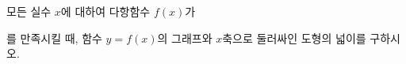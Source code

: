 모든 실수 $x$에 대하여 다항함수 $f(x)$가 \par\smallskip{}\par\smallskip\noindent 를 만족시킬 때, 함수 $y=f(x)$의 그래프와 $x$축으로 둘러싸인 도형의 넓이를 구하시오.
